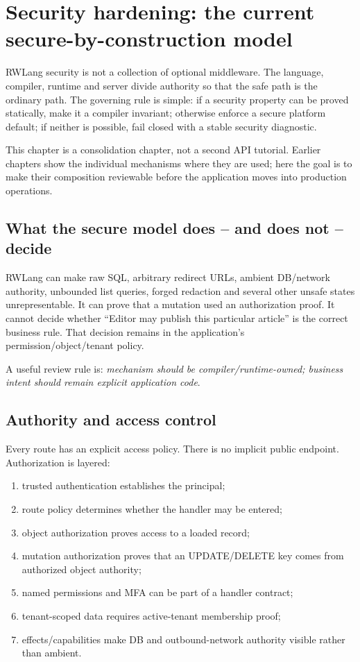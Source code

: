\chapter{Security hardening: the current secure-by-construction model}

RWLang security is not a collection of optional middleware. The language, compiler, runtime and server divide authority so that the safe path is the ordinary path. The governing rule is simple: if a security property can be proved statically, make it a compiler invariant; otherwise enforce a secure platform default; if neither is possible, fail closed with a stable security diagnostic.

This chapter is a consolidation chapter, not a second API tutorial. Earlier chapters show the individual mechanisms where they are used; here the goal is to make their composition reviewable before the application moves into production operations.

\section{What the secure model does -- and does not -- decide}

RWLang can make raw SQL, arbitrary redirect URLs, ambient DB/network authority, unbounded list queries, forged redaction and several other unsafe states unrepresentable. It can prove that a mutation used an authorization proof. It cannot decide whether ``Editor may publish this particular article'' is the correct business rule. That decision remains in the application's permission/object/tenant policy.

A useful review rule is: \emph{mechanism should be compiler/runtime-owned; business intent should remain explicit application code}.

\section{Authority and access control}

Every route has an explicit access policy. There is no implicit public endpoint. Authorization is layered:

\begin{enumerate}
  \item trusted authentication establishes the principal;
  \item route policy determines whether the handler may be entered;
  \item object authorization proves access to a loaded record;
  \item mutation authorization proves that an UPDATE/DELETE key comes from authorized object authority;
  \item named permissions and MFA can be part of a handler contract;
  \item tenant-scoped data requires active-tenant membership proof;
  \item effects/capabilities make DB and outbound-network authority visible rather than ambient.
\end{enumerate}

